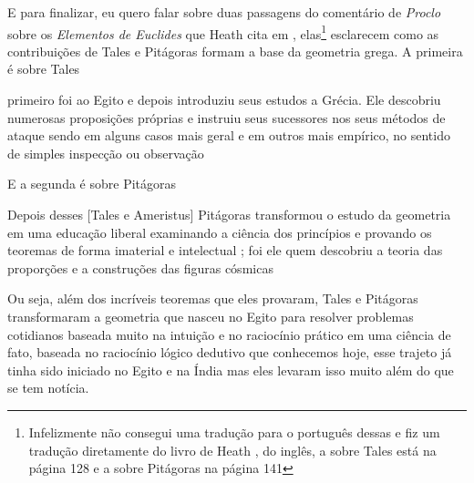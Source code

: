 \documentclass{article}
\begin{document}
E para finalizar, eu quero falar sobre duas passagens do comentário de \emph{Proclo}
sobre os \emph{Elementos de Euclides} que
Heath cita em \cite{Heath}, elas\footnote{
Infelizmente não consegui uma tradução para o português dessas e
fiz um tradução diretamente do livro de Heath \cite{Heath}, do inglês, a
sobre Tales está na página 128 e a sobre Pitágoras na página 141} esclarecem 
como as contribuições
de Tales e Pitágoras formam a base da geometria grega. A primeira é sobre
Tales

\begin{framed}
	[...] primeiro foi ao Egito e depois introduziu seus estudos 
	a Grécia. Ele descobriu numerosas proposições próprias e 
	instruiu seus sucessores nos seus métodos de ataque sendo em
	alguns casos mais geral e em outros mais empírico, no sentido
	de simples inspecção ou observação
\end{framed}

E a segunda é sobre Pitágoras

\begin{framed}
	Depois desses [Tales e Ameristus] Pitágoras transformou o estudo
	da geometria em uma educação liberal examinando a ciência dos 
	princípios e provando os teoremas de forma imaterial e intelectual ;
	foi ele quem descobriu a teoria das proporções e a construções das 
	figuras cósmicas 
\end{framed}

Ou seja, além dos incríveis teoremas que eles provaram, Tales e Pitágoras
transformaram a geometria que nasceu no Egito para resolver problemas cotidianos
baseada muito na intuição e no raciocínio prático em uma ciência de fato,
baseada no raciocínio lógico dedutivo que conhecemos hoje,
esse trajeto já tinha sido iniciado no Egito e na Índia mas eles levaram isso 
muito além do que se tem notícia.



\end{document}
